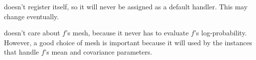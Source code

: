  doesn't register itself, so it will never be assigned as a default handler. This may change eventually.

 doesn't care about $f$'s mesh, because it never has to evaluate $f$'s log-probability. However, a good choice of mesh is important because it will used by the  instances that handle $f$'s mean and covariance parameters.


%
%
%
